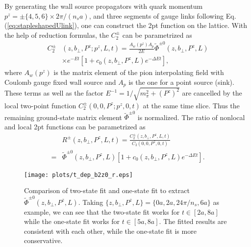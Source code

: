 \documentclass[prd,aps,twocolumn,preprintnumbers, showpacs, nofootinbib,superscriptaddress,notitlepage]{revtex4-1}
\newcommand\bl{\color{blue}}
\begin{document}
By generating the wall source propagators with quark momentum $p^z=\pm\{4,5,6\}\times2\pi/(n_sa)$, and three segments of gauge links {\bl following} Eq.(\ref{eq:stapleshapedUlink}), one  can construct  the 2pt {\bl function} on the  lattice. With the help of {\bl reduction formulas}, the $C_2^{\pm}$ can be parametrized as
 \begin{align}
C_2^{\pm}&\left(z,b_{\perp},P^z; p^z,L,t \right)=\frac{A_w(p^z)A_p}{2E}\tilde{\Phi}^{\pm0}\left(z,b_{\perp},P^z,L\right) \nonumber\\
& \times e^{-Et}\left[1+c_0\left(z,b_{\perp},P^z,L\right)e^{-\Delta Et} \right], \label{eq:C2parametrization}
 \end{align}
where $A_w(p^z)$ is the matrix element of {\bl the pion interpolating} ﬁeld with Coulomb gauge fixed wall source and $A_p$ is the one {\bl for a} point source (sink). These terms as well as the {\bl factor $E^{-1}=1/\sqrt{m_{\pi}^2+\left(P^z\right)^2}$ are cancelled} by the local  two-point function $C_2^{\pm}\left(0,0,P^z; p^z,0,t \right)$ at the same time slice. Thus the remaining  ground-state matrix element $\tilde{\Phi}^{\pm0}$ is normalized. The ratio of nonlocal and local 2pt {\bl functions} can be parametrized  as
\begin{align}
&R^{\pm}\left(z,b_{\perp},P^z,L,t \right)=\frac{C_2^{\pm}\left(z,b_{\perp},P^z,L,t \right)}{C_2\left(0,0,P^z,0,t \right)} \nonumber\\
=&\tilde{\Phi}^{\pm0}\left(z,b_{\perp},P^z,L\right)\left[1+c_0\left(z,b_{\perp},P^z,L\right)e^{-\Delta Et} \right].
\label{eq:two-state-fit}
\end{align}
 
 
\begin{figure}
\centering
\texttt{[image: plots/t\_dep\_b2z0\_r.eps]}
\caption{Comparison of  two-state fit  and  one-state fit to {\bl extract} $\tilde{\Phi}^{\pm0}\left(z,b_{\perp},P^z,L\right)$. {\bl Taking} $\{z,b_{\perp},P^z,L\}=\{0a, 2a, 24\pi/n_s, 6a\}$ {\bl as} example, we can see that  the two-state fit works {\bl for} $t\in[2a, 8a]$ while the one-state fit works {\bl for} $t\in[5a, 8a]$. The fitted  results are consistent with each other, while  the one-state fit is more conservative. }
\label{fig:tdependenceofratio}
\end{figure}
 
\end{document}
